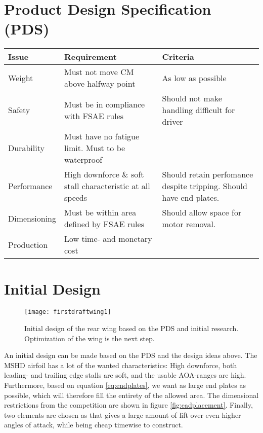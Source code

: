   \section{Product Design Specification (PDS)}
  \label{sec:PDS}
    \begin{tabularx}{\textwidth}[t]{>{\columncolor{seapurple!40}}l XX}
    \arrayrulecolor{seapurple}\hline
    \rowcolor{white}
    \textbf{\textcolor{seapurple}{Issue}} & \textbf{\textcolor{seapurple}{Requirement}} & \textbf{\textcolor{seapurple}{Criteria}}\\
    \hline
    Weight & Must not move CM above halfway point & As low as possible \\
    Safety & Must be in compliance with FSAE rules & Should not make handling difficult for driver\\
    Durability & Must have no fatigue limit. Must to be waterproof & \\
    Performance & High downforce \& soft stall characteristic at all speeds & Should retain perfomance despite tripping. Should have end plates.\\
    Dimensioning & Must be within area defined by FSAE rules & Should allow space for motor removal. \\
    Production & Low time- and monetary cost & \\
    \end{tabularx}

  \section{Initial Design}

    \begin{figure}
      \texttt{[image: firstdraftwing1]}
      \caption{Initial design of the rear wing based on the PDS and initial research. Optimization of the wing is the next step.}
      \label{fig:firstdraftwing}
    \end{figure}

    An initial design can be made based on the PDS and the design ideas above. The MSHD airfoil has a lot of the wanted characteristics: High downforce, both leading- and trailing edge stalls are soft, and the usable AOA-ranges are high. Furthermore, based on equation \ref{eq:endplates}, we want as large end plates as possible, which will therefore fill the entirety of the allowed area. The dimensional restrictions from the competition are shown in figure \ref{fig:cadplacement}. Finally, two elements are chosen as that gives a large amount of lift over even higher angles of attack, while being cheap timewise to construct.

